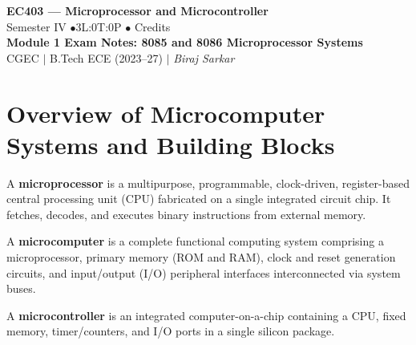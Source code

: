 \documentclass[12pt,a4paper]{article}
\begin{document}
\begin{center}
  {\LARGE\bfseries\color{myred} EC403 --- Microprocessor and Microcontroller}\\[5pt]
  {\normalsize\color{mydark} Semester IV \quad$\bullet$\quad 3L:0T:0P \quad$\bullet$ Credits}\\[3pt]
  {\normalsize\color{myteal}\textbf{Module 1 Exam Notes: 8085 and 8086 Microprocessor Systems}}\\[3pt]
  {\small\color{mydark} CGEC \;$|$\; B.Tech ECE (2023--27) \;$|$\; \textit{Biraj Sarkar}}
\end{center}
\vspace{2pt}
\noindent{\color{myred}\rule{\linewidth}{1.5pt}}
\vspace{2pt}

\hypersetup{linkcolor=mydark}
\tableofcontents
\hypersetup{linkcolor=myteal}
\newpage

\section{Overview of Microcomputer Systems and Building Blocks}

\begin{tcolorbox}[defbox, title={Microprocessor, Microcomputer, and Microcontroller}]
A \textbf{microprocessor} is a multipurpose, programmable, clock-driven, register-based central processing unit (CPU) fabricated on a single integrated circuit chip. It fetches, decodes, and executes binary instructions from external memory.

A \textbf{microcomputer} is a complete functional computing system comprising a microprocessor, primary memory (ROM and RAM), clock and reset generation circuits, and input/output (I/O) peripheral interfaces interconnected via system buses.

A \textbf{microcontroller} is an integrated computer-on-a-chip containing a CPU, fixed memory, timer/counters, and I/O ports in a single silicon package.
\end{tcolorbox}
\end{document}
